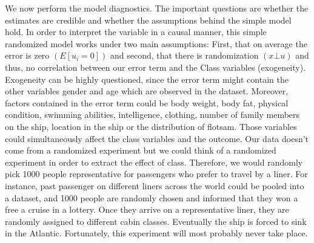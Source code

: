 \documentclass[
]{article}
\begin{document}
We now perform the model diagnostics. The important questions are
whether the estimates are credible and whether the assumptions behind
the simple model hold. In order to interpret the variable in a causal
manner, this simple randomized model works under two main assumptions:
First, that on average the error is zero \((E[u_i = 0])\) and second,
that there is randomization \((x \bot u)\) and thus, no correlation
between our error term and the Class variables (exogeneity). Exogeneity
can be highly questioned, since the error term might contain the other
variables gender and age which are observed in the dataset. Moreover,
factors contained in the error term could be body weight, body fat,
physical condition, swimming abilities, intelligence, clothing, number
of family members on the ship, location in the ship or the distribution
of flotsam. Those variables could simultaneously affect the class
variables and the outcome. Our data doesn't come from a randomized
experiment but we could think of a randomized experiment in order to
extract the effect of class. Therefore, we would randomly pick 1000
people representative for passengers who prefer to travel by a liner.
For instance, past passenger on different liners across the world could
be pooled into a dataset, and 1000 people are randomly chosen and
informed that they won a free a cruise in a lottery. Once they arrive on
a representative liner, they are randomly assigned to different cabin
classes. Eventually the ship is forced to sink in the Atlantic.
Fortunately, this experiment will most probably never take place.
\end{document}

